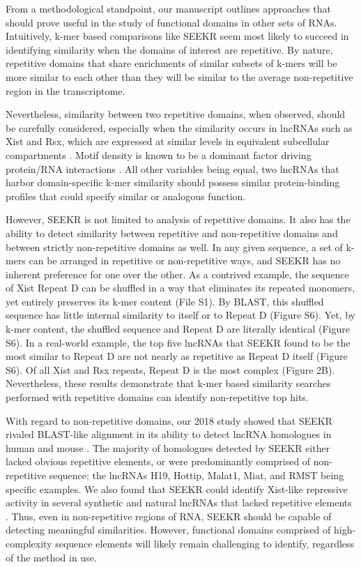 From a methodological standpoint, our manuscript outlines approaches that should prove useful in the study of functional domains in other sets of RNAs. Intuitively, k-mer based comparisons like SEEKR seem most likely to succeed in identifying similarity when the domains of interest are repetitive. By nature, repetitive domains that share enrichments of similar subsets of k-mers will be more similar to each other than they will be similar to the average non-repetitive region in the transcriptome. 

Nevertheless, similarity between two repetitive domains, when observed, should be carefully considered, especially when the similarity occurs in lncRNAs such as Xist and Rsx, which are expressed at similar levels in equivalent subcellular compartments \cite{Grant2012RsxInactivation,Wang2014Chromosome-wideDomestica}. Motif density is known to be a dominant factor driving protein/RNA interactions \cite{Dominguez2018SequenceProteins,Kirk2018FunctionalContent,Wang2014Chromosome-wideDomestica}. All other variables being equal, two lncRNAs that harbor domain-specific k-mer similarity should possess similar protein-binding profiles that could specify similar or analogous function. 

However, SEEKR is not limited to analysis of repetitive domains. It also has the ability to detect similarity between repetitive and non-repetitive domains and between strictly non-repetitive domains as well. In any given sequence, a set of k-mers can be arranged in repetitive or non-repetitive ways, and SEEKR has no inherent preference for one over the other. As a contrived example, the sequence of Xist Repeat D can be shuffled in a way that eliminates its repeated monomers, yet entirely preserves its k-mer content (File S1). By BLAST, this shuffled sequence has little internal similarity to itself or to Repeat D (Figure S6). Yet, by k-mer content, the shuffled sequence and Repeat D are literally identical (Figure S6). In a real-world example, the top five lncRNAs that SEEKR found to be the most similar to Repeat D are not nearly as repetitive as Repeat D itself (Figure S6). Of all Xist and Rsx repeats, Repeat D is the most complex (Figure 2B). Nevertheless, these results demonstrate that k-mer based similarity searches performed with repetitive domains can identify non-repetitive top hits.

With regard to non-repetitive domains, our 2018 study showed that SEEKR rivaled BLAST-like alignment in its ability to detect lncRNA homologues in human and mouse  \cite{Kirk2018FunctionalContent}. The majority of homologues detected by SEEKR either lacked obvious repetitive elements, or were predominantly comprised of non-repetitive sequence; the lncRNAs H19, Hottip, Malat1, Miat, and RMST being specific examples. We also found that SEEKR could identify Xist-like repressive activity in several synthetic and natural lncRNAs that lacked repetitive elements \cite{Kirk2018FunctionalContent}. Thus, even in non-repetitive regions of RNA, SEEKR should be capable of detecting meaningful similarities. However, functional domains comprised of high-complexity sequence elements will likely remain challenging to identify, regardless of the method in use.


